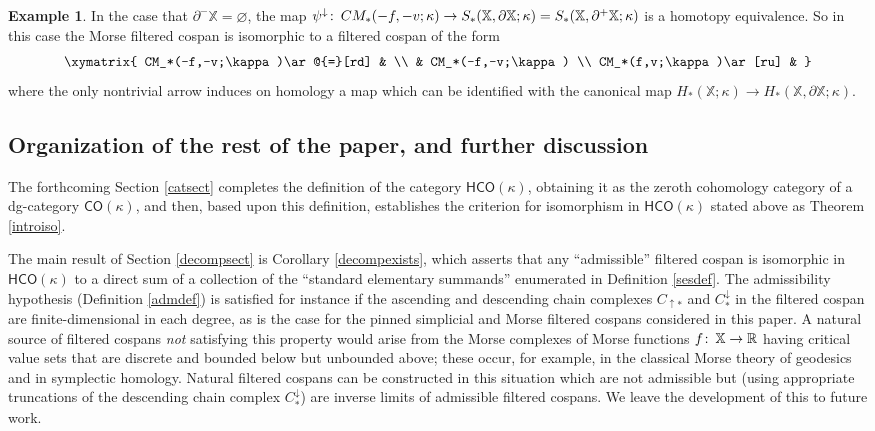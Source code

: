 \documentclass[11pt]{amsart}
\theoremstyle{definition}
\newtheorem{ex}[theorem]{Example}
\theoremstyle{remark}
\numberwithin{equation}{section}
\def\co{\colon\thinspace}
\def\R{\mathbb{R}}
\begin{document}
\begin{ex}
In the case that $\partial^-\mathbb{X}=\varnothing$, the map $\psi^{\downarrow}\co CM_*(-f,-v;\kappa)\to S_*(\mathbb{X},\partial\mathbb{X};\kappa)=S_*(\mathbb{X},\partial^+\mathbb{X};\kappa)$ is a homotopy equivalence. So in this case the Morse filtered cospan is isomorphic to a filtered cospan of the form \[ \xymatrix{ CM_*(-f,-v;\kappa)\ar@{=}[rd] & \\ &  CM_*(-f,-v;\kappa) \\ CM_*(f,v;\kappa)\ar[ru] & } \] where the only nontrivial arrow induces on homology a map which can be identified with the canonical map $H_*(\mathbb{X};\kappa)\to H_*(\mathbb{X},\partial\mathbb{X};\kappa)$. 
\end{ex}











\subsection{Organization of the rest of the paper, and further discussion}


The forthcoming Section \ref{catsect} completes the definition of the category $\mathsf{HCO}(\kappa)$, obtaining it as the zeroth cohomology category of a dg-category $\mathsf{CO}(\kappa)$, and then, based upon this definition, establishes the criterion for isomorphism in $\mathsf{HCO}(\kappa)$ stated above as Theorem \ref{introiso}.

The main result of Section \ref{decompsect} is Corollary \ref{decompexists}, which asserts that any ``admissible'' filtered cospan is isomorphic in $\mathsf{HCO}(\kappa)$ to a direct sum of a collection of the ``standard elementary summands'' enumerated in Definition \ref{sesdef}.  The admissibility hypothesis (Definition \ref{admdef}) is satisfied for instance if the ascending and descending chain complexes $C_{\uparrow *}$ and $C^{\downarrow}_{*}$ in the filtered cospan are finite-dimensional in each degree, as is the case for the pinned simplicial and Morse filtered cospans considered in this paper.  A natural source of filtered cospans \emph{not} satisfying this property would arise from the Morse complexes of Morse functions $f\co \mathbb{X}\to \R$ having critical value sets that are discrete and bounded below but unbounded above; these occur, for example, in the classical Morse theory of geodesics and in symplectic homology. Natural  filtered cospans can be constructed in this situation which are not admissible but (using appropriate truncations of the descending chain complex $C^{\downarrow}_{*}$) are inverse limits of admissible filtered cospans.  We leave the development of this to future work.     
\end{document}

